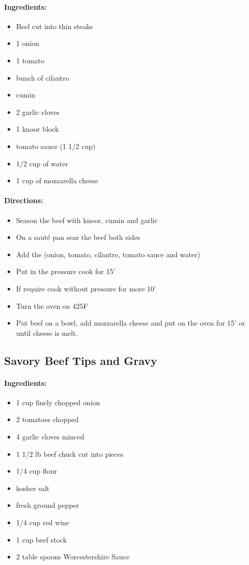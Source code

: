 \documentclass{article}
\begin{document}
\paragraph{Ingredients:}

\begin{itemize}
	\item Beef cut into thin steaks
	\item 1 onion
	\item 1 tomato
	\item bunch of cilantro
	\item cumin
	\item 2 garlic cloves
	\item 1 knoor block
	\item tomato sauce (1 1/2 cup)
	\item 1/2 cup of water
	\item 1 cup of mozzarella cheese
\end{itemize}

\paragraph{Directions:}
\begin{itemize}
	\item Season the beef with knoor, cumin and garlic
	\item On a sauté pan sear the beef both sides
	\item Add the (onion, tomato, cilantro, tomato sauce and water)
	\item Put in the pressure cook for 15'
	\item If require cook without pressure for more 10'
	\item Turn the oven on 425F
	\item Put beef on a bowl, add mozzarella cheese and put on the oven for 15' or until cheese is melt.
\end{itemize}

\subsection{Savory Beef Tips and Gravy}

\paragraph{Ingredients:}
\begin{itemize}
  \item 1 cup finely chopped onion
  \item 2 tomatoes chopped
  \item 4 garlic cloves minced
  \item 1 1/2 lb beef chuck cut into pieces
  \item 1/4 cup flour
  \item kosher salt
  \item fresh ground pepper
  \item 1/4 cup red wine
  \item 1 cup beef stock
  \item 2 table spoons Worcestershire Sauce	
\end{itemize}
\end{document}
